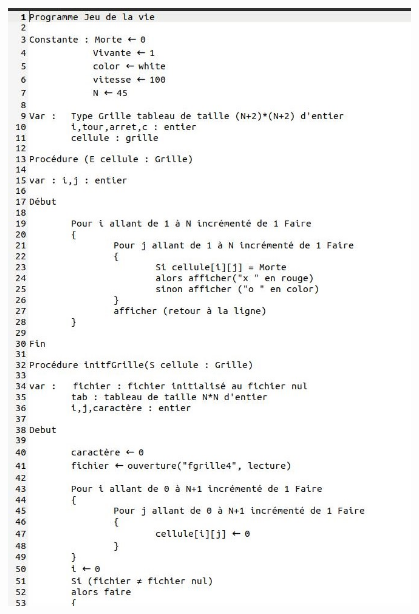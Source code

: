 \documentclass[12,french]{report}
\begin{document}
\begin{center}

	\includegraphics[width=0.8\textwidth]{./Images/Pseudo_code_1'}\\
	

\end{center}
\end{document}
